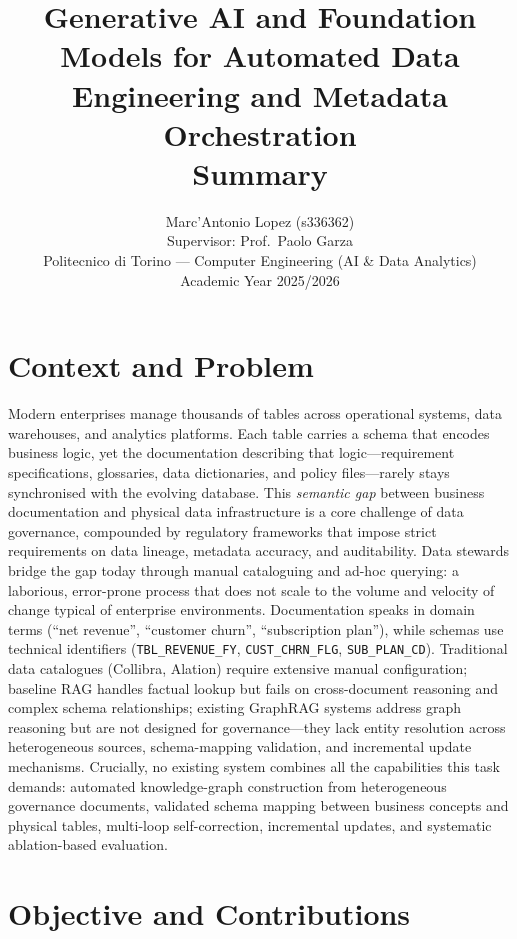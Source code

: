 \documentclass[11pt,a4paper]{article}
\title{\vspace{-1.5em}\bfseries Generative AI and Foundation Models for Automated Data Engineering and Metadata Orchestration\\\large\normalfont Summary}
\author{Marc'Antonio Lopez (s336362)\\[2pt]\small Supervisor: Prof.\ Paolo Garza\\
\small Politecnico di Torino --- Computer Engineering (AI \& Data Analytics)\\
\small Academic Year 2025/2026}
\date{}
\begin{document}
\maketitle
\vspace{-1.5em}

\section{Context and Problem}

Modern enterprises manage thousands of tables across operational systems, data warehouses, and analytics platforms. Each table carries a schema that encodes business logic, yet the documentation describing that logic---requirement specifications, glossaries, data dictionaries, and policy files---rarely stays synchronised with the evolving database. This \emph{semantic gap} between business documentation and physical data infrastructure is a core challenge of data governance, compounded by regulatory frameworks that impose strict requirements on data lineage, metadata accuracy, and auditability. Data stewards bridge the gap today through manual cataloguing and ad-hoc querying: a laborious, error-prone process that does not scale to the volume and velocity of change typical of enterprise environments. Documentation speaks in domain terms (``net revenue'', ``customer churn'', ``subscription plan''), while schemas use technical identifiers (\texttt{TBL\_REVENUE\_FY}, \texttt{CUST\_CHRN\_FLG}, \texttt{SUB\_PLAN\_CD}). Traditional data catalogues (Collibra, Alation) require extensive manual configuration; baseline RAG handles factual lookup but fails on cross-document reasoning and complex schema relationships; existing GraphRAG systems address graph reasoning but are not designed for governance---they lack entity resolution across heterogeneous sources, schema-mapping validation, and incremental update mechanisms. Crucially, no existing system combines all the capabilities this task demands: automated knowledge-graph construction from heterogeneous governance documents, validated schema mapping between business concepts and physical tables, multi-loop self-correction, incremental updates, and systematic ablation-based evaluation.

\section{Objective and Contributions}
\end{document}

